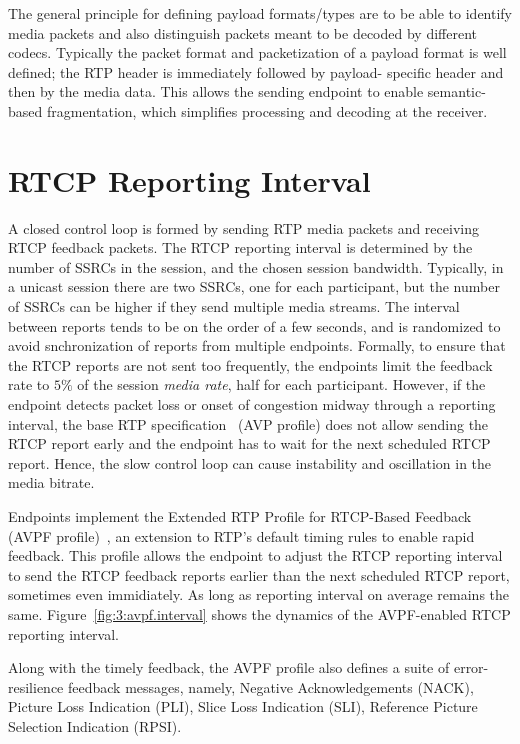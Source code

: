 The general principle for defining payload formats/types are to be able to
identify media packets and also distinguish packets meant to be decoded by
different codecs. Typically the packet format and packetization of a payload
format is well defined; the RTP header is immediately followed by payload-
specific header and then by the media data. This allows the sending endpoint
to enable semantic-based fragmentation, which simplifies processing and
decoding at the receiver.

\section{RTCP Reporting Interval}

A closed control loop is formed by sending RTP media packets and receiving
RTCP feedback packets. The RTCP reporting interval is determined by the number
of SSRCs in the session, and the chosen session bandwidth. Typically, in a
unicast session there are two SSRCs, one for each participant, but the number
of SSRCs can be higher if they send multiple media streams. The interval
between reports tends to be on the order of a few seconds, and is randomized
to avoid snchronization of reports from multiple endpoints. Formally, to
ensure that the RTCP reports are not sent too frequently, the endpoints limit
the feedback rate to $5\%$ of the session \textit{media rate}, half for each
participant. However, if the endpoint detects packet loss or onset of
congestion midway through a reporting interval, the base RTP
specification~\cite{rfc3550} (AVP profile) does not allow sending the RTCP
report early and the endpoint has to wait for the next scheduled RTCP report.
Hence, the slow control loop can cause instability and oscillation in the
media bitrate.


Endpoints implement the Extended RTP Profile for RTCP-Based Feedback (AVPF
profile)~\cite{rfc4585}, an extension to RTP's default timing rules to enable
rapid feedback. This profile allows the endpoint to adjust the RTCP reporting
interval to send the RTCP feedback reports earlier than the next scheduled
RTCP report, sometimes even immidiately. As long as reporting interval on
average remains the same. Figure~\ref{fig:3:avpf.interval} shows the dynamics
of the AVPF-enabled RTCP reporting interval.

Along with the timely feedback, the AVPF profile also defines a suite of
error-resilience feedback messages, namely, Negative Acknowledgements (NACK),
Picture Loss Indication (PLI), Slice Loss Indication (SLI), Reference Picture
Selection Indication (RPSI).

